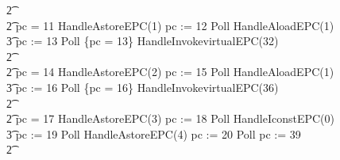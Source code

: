 \begin{figure}[t!]
\begin{circus}
    \t2 {} \cdots {} \\
    \t2 {} \circelse pc = 11 \circthen HandleAstoreEPC(1) \circseq pc := 12 \circseq Poll \circseq HandleAloadEPC(1) \circseq \\
    \t3 pc := 13 \circseq Poll \circseq \{pc = 13\} \circseq HandleInvokevirtualEPC(32) \\
    \t2 {} \cdots {} \\
    \t2 {} \circelse pc = 14 \circthen HandleAstoreEPC(2) \circseq pc := 15 \circseq Poll \circseq HandleAloadEPC(1) \circseq \\
    \t3 pc := 16 \circseq Poll \circseq \{pc = 16\} \circseq HandleInvokevirtualEPC(36) \\
    \t2 {} \cdots {} \\
    \t2 {} \circelse pc = 17 \circthen HandleAstoreEPC(3) \circseq pc := 18 \circseq Poll \circseq HandleIconstEPC(0) \circseq \\
    \t3 pc := 19 \circseq Poll \circseq HandleAstoreEPC(4) \circseq pc := 20 \circseq Poll \circseq pc := 39 \\
    \t2 {} \cdots {} \\

\end{circus}
\end{figure}
